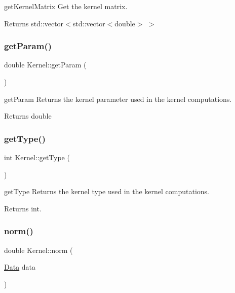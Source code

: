 get\+Kernel\+Matrix Get the kernel matrix. 

\begin{DoxyReturn}{Returns}
std\+::vector$<$std\+::vector$<$double$>$ $>$ 
\end{DoxyReturn}
\mbox{\label{class_kernel_a838e2cc5018fa702e59c52a3bf8ef813}} 
\subsubsection{\texorpdfstring{get\+Param()}{getParam()}}
{\footnotesize\ttfamily double Kernel\+::get\+Param (\begin{DoxyParamCaption}{ }\end{DoxyParamCaption})}



get\+Param Returns the kernel parameter used in the kernel computations. 

\begin{DoxyReturn}{Returns}
double 
\end{DoxyReturn}
\mbox{\label{class_kernel_a5a2cb0fce0eda6c67a2325f6c8958da8}} 
\subsubsection{\texorpdfstring{get\+Type()}{getType()}}
{\footnotesize\ttfamily int Kernel\+::get\+Type (\begin{DoxyParamCaption}{ }\end{DoxyParamCaption})}



get\+Type Returns the kernel type used in the kernel computations. 

\begin{DoxyReturn}{Returns}
int. 
\end{DoxyReturn}
\mbox{\label{class_kernel_a1f548d2e5477ae0ee3dd3bc7f23e6920}} 
\subsubsection{\texorpdfstring{norm()}{norm()}}
{\footnotesize\ttfamily double Kernel\+::norm (\begin{DoxyParamCaption}\item[{\hyperlink{class_data}{Data}}]{data }\end{DoxyParamCaption})}



